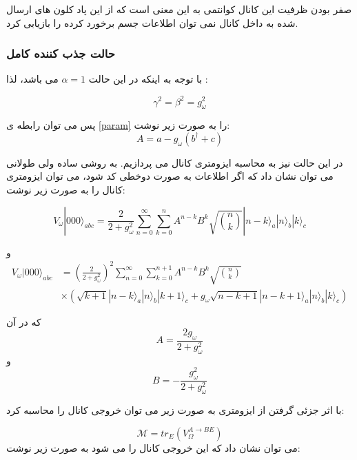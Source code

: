صفر بودن ظرفیت این کانال کوانتمی به این معنی است که از این پاد کلون های ارسال شده به داخل کانال نمی توان اطلاعات جسم برخورد کرده را بازیابی کرد.

\subsubsection{حالت جذب کننده کامل}
با توجه به اینکه در این حالت
$\alpha=1$
می باشد، لذا :

\begin{equation}
	\gamma^2 = \beta^2 = g_\omega^2
\end{equation}

پس می توان رابطه ی 
\ref{param}
را به صورت زیر نوشت:
\begin{equation}
A = a - g_\omega ( b^\dagger + c)
\end{equation}

در این حالت نیز به محاسبه ایزومتری کانال می پردازیم. به روشی ساده ولی طولانی می توان نشان داد 
\cite{qit}
که اگر اطلاعات به صورت دوخطی
کد شود، می توان ایزومتری کانال را به صورت زیر نوشت:

\begin{equation}
	V_\omega |000\rangle_{abc} = \frac{2}{2+g_\omega^2} \sum_{n=0}^{\infty} \sum_{k=0}^{n} A^{n-k} B^{k} \sqrt{\binom{n}{k}} |n-k\rangle_a |n\rangle_b |k\rangle_c
\end{equation}

و 
\begin{align}
	V_\omega |000\rangle_{abc} &= (\frac{2}{2+g_\omega^2})^2 \sum_{n=0}^{\infty} \sum_{k=0}^{n+1} A^{n-k} B^{k} \sqrt{\binom{n}{k}} \\
	& \times  (\sqrt{k+1} |n-k\rangle_a |n\rangle_b |k+1\rangle_c  + g_\omega \sqrt{n-k+1} |n-k+1\rangle_a |n\rangle_b |k\rangle_c )
\end{align}

که در آن
\begin{equation}
	A= \frac{2g_\omega}{2+g_\omega^2}
\end{equation}
و
\begin{equation}
	B= - \frac{g_\omega^2}{2+g_\omega^2}
\end{equation}

با اثر جزئی گرفتن از ایزومتری به صورت زیر می توان خروجی کانال را محاسبه کرد:

\begin{equation}
\mathcal{M} = tr_E (V_\Omega ^{A \to BE})
\end{equation}
می توان نشان داد 
\cite{qit}
که این خروجی کانال را می شود به صورت زیر نوشت:

